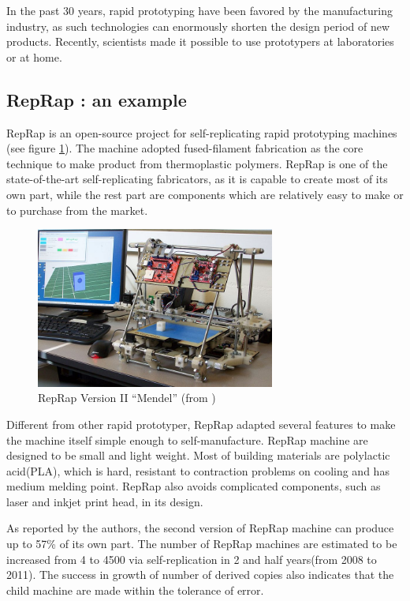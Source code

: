 \documentclass[12pt,twoside]{article}
\theoremstyle{plain}
\theoremstyle{definition}
\theoremstyle{remark}
\begin{document}
In the past 30 years, rapid prototyping have been favored by the manufacturing industry, as such technologies can enormously shorten the design period of new products. Recently, scientists made it possible to use prototypers at laboratories or at home.

\subsection{RepRap : an example}
RepRap is an open-source project for self-replicating rapid prototyping machines\cite{jones_reprap_2011} (see figure \ref{fig:reprap}). The machine adopted fused-filament
fabrication as the core technique to make product from thermoplastic polymers.
RepRap is one of the state-of-the-art self-replicating fabricators, as it is capable to create most of its own part, while the rest part are components which are relatively easy to make or to purchase from the market.

\begin{figure}[hbtp]
	 \centerline{\includegraphics[width=0.7\textwidth]{mendel}}
	 {\caption{RepRap Version II ``Mendel'' (from \cite{jones_reprap_2011})}
	 \label{fig:reprap}}
\end{figure}

Different from other rapid prototyper, RepRap adapted several features to make the machine itself simple enough to self-manufacture. RepRap machine are designed to be small and light weight. Most of building materials are polylactic acid(PLA), which is hard, resistant to contraction problems on cooling and has medium melding point. RepRap also avoids complicated components, such as laser and inkjet print head, in its design.

As reported by the authors, the second version of RepRap machine can produce up to 57\% of its own part. The number of RepRap machines are estimated to be increased from 4 to 4500 via self-replication in 2 and half years(from 2008 to 2011). The success in growth of number of derived copies also indicates that the child machine are made within the tolerance of error.
\end{document}
